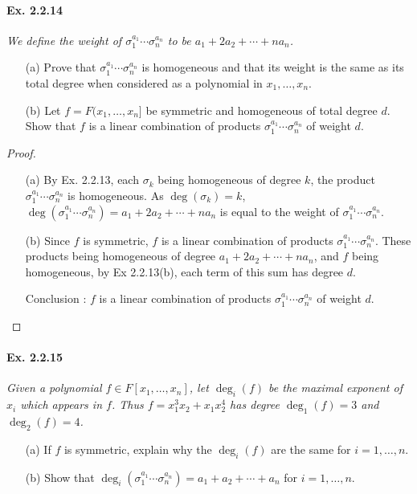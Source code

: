 \documentclass[11pt,a4paper]{article}
\begin{document}
\paragraph{Ex. 2.2.14}

{\it We define the weight of $\sigma_1^{a_1}\cdots \sigma_n^{a_n}$ to be $a_1+2a_2+\cdots+na_n$.
\begin{enumerate}
\item[(a)] Prove that $\sigma_1^{a_1}\cdots \sigma_n^{a_n}$ is homogeneous and that its weight is the same as its total degree when considered as a polynomial in $x_1,\ldots,x_n$.
\item[(b)] Let $f = F(x_1,\ldots,x_n]$ be symmetric and homogeneous of total degree $d$. Show that $f$ is a linear combination of products $\sigma_1^{a_1}\cdots \sigma_n^{a_n}$ of weight $d$.
\end{enumerate}
}

\begin{proof}
\begin{enumerate}
\item[(a)] By Ex. 2.2.13, each $\sigma_k$ being homogeneous of degree $k$, the product $\sigma_1^{a_1}\cdots \sigma_n^{a_n}$ is homogeneous. As $\deg(\sigma_k) = k$, $\deg(\sigma_1^{a_1}\cdots \sigma_n^{a_n}) = a_1+2a_2+\cdots+na_n$ is equal to the weight of $\sigma_1^{a_1}\cdots \sigma_n^{a_n}$.
\item[(b)] Since $f$ is symmetric, $f$ is a linear combination of products $\sigma_1^{a_1}\cdots \sigma_n^{a_n}$. These products being homogeneous of degree $a_1+2a_2+\cdots+na_n$, and $f$ being homogeneous, by Ex 2.2.13(b), each term of this sum has degree $d$.

Conclusion : $f$ is a linear combination of products $\sigma_1^{a_1}\cdots \sigma_n^{a_n}$ of weight $d$.

\end{enumerate}
\end{proof}

\paragraph{Ex. 2.2.15}

{\it Given a polynomial $f \in F[x_1,\ldots,x_n]$, let $\deg_i(f)$ be the maximal exponent of $x_i$ which appears in $f$. Thus $f =x_1^3x_2 +x_1x_2^4$ has degree $\deg_1(f) = 3$ and $\deg_2(f) = 4$.
\begin{enumerate}
\item[(a)] If $f$ is symmetric, explain why the $\deg_i(f)$ are the same for $i=1,\ldots,n$.
\item[(b)] Show that $\deg_i(\sigma_1^{a_1}\cdots \sigma_n^{a_n}) = a_1+a_2+\cdots+a_n$ for $i=1,\ldots,n$.
\end{enumerate}
}
\end{document}

